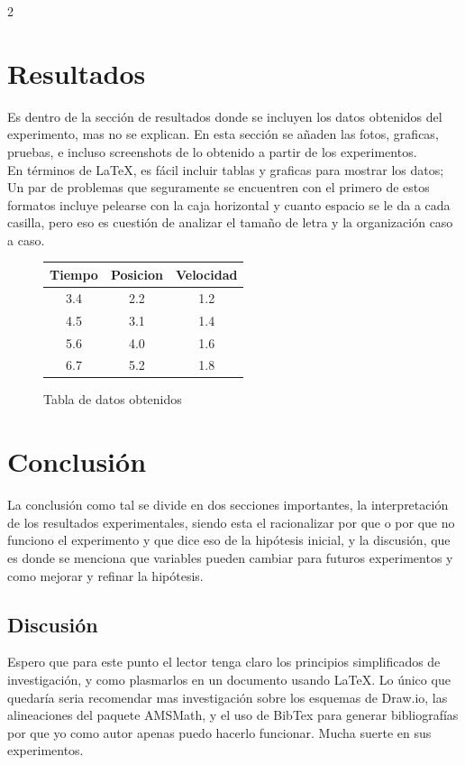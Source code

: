 \documentclass[12pt]{article}
\begin{document}
\begin{multicols}{2}
\section{Resultados}
Es dentro de la sección de resultados donde se incluyen los datos obtenidos del experimento, mas no se explican. En esta sección se añaden las fotos, graficas, pruebas, e incluso screenshots de lo obtenido a partir de los experimentos.\\
En términos de \LaTeX, es fácil incluir tablas y graficas para mostrar los datos; Un par de problemas que seguramente se encuentren con el primero de estos formatos incluye pelearse con la caja horizontal y cuanto espacio se le da a cada casilla, pero eso es cuestión de analizar el tamaño de letra y la organización caso a caso.
\begin{figure}[H] %
    \centering
    \begin{tabular}{|c||c|c|} %
    \hline
        \textbf{Tiempo} & \textbf{Posicion} & \textbf{Velocidad} \\ \hline
        3.4 & 2.2 & 1.2 \\ \hline
        4.5 & 3.1 & 1.4 \\ \hline
        5.6 & 4.0 & 1.6 \\ \hline
        6.7 & 5.2 & 1.8 \\ \hline    
    \end{tabular}
    \caption{Tabla de datos obtenidos}
    \label{fig:tabla}
\end{figure}

\section{Conclusión}
La conclusión como tal se divide en dos secciones importantes, la interpretación de los resultados experimentales, siendo esta el racionalizar por que o por que no funciono el experimento y que dice eso de la hipótesis inicial, y la discusión, que es donde se menciona que variables pueden cambiar para futuros experimentos y como mejorar y refinar la hipótesis.
\subsection{Discusión}
Espero que para este punto el lector tenga claro los principios simplificados de investigación, y como plasmarlos en un documento usando \LaTeX. Lo único que quedaría seria recomendar mas investigación sobre los esquemas de Draw.io, las alineaciones del paquete AMSMath, y el uso de BibTex para generar bibliografías por que yo como autor apenas puedo hacerlo funcionar. Mucha suerte en sus experimentos.

\end{multicols}
\end{document}
